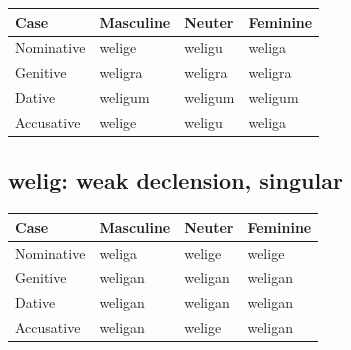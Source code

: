 \par\begingroup
\fontsize{10.5}{13.2}\selectfont
\setlength{\LTleft}{0pt}\setlength{\LTright}{\fill}
\noindent
\begin{tabular}{@{}>{\raggedright\arraybackslash}p{28.89mm}>{\raggedright\arraybackslash}p{28.89mm}>{\raggedright\arraybackslash}p{28.89mm}>{\raggedright\arraybackslash}p{28.89mm}@{}}
\toprule
\textbf{Case} & \textbf{Masculine} & \textbf{Neuter} & \textbf{Feminine} \\
\midrule
Nominative & welige & weligu & weliga \\
Genitive & weligra & weligra & weligra \\
Dative & weligum & weligum & weligum \\
Accusative & welige & weligu & weliga \\
\bottomrule
\end{tabular}
\par\endgroup

\subsection*{welig: weak declension, singular}

\par\begingroup
\fontsize{10.5}{13.2}\selectfont
\setlength{\LTleft}{0pt}\setlength{\LTright}{\fill}
\noindent
\begin{tabular}{@{}>{\raggedright\arraybackslash}p{28.89mm}>{\raggedright\arraybackslash}p{28.89mm}>{\raggedright\arraybackslash}p{28.89mm}>{\raggedright\arraybackslash}p{28.89mm}@{}}
\toprule
\textbf{Case} & \textbf{Masculine} & \textbf{Neuter} & \textbf{Feminine} \\
\midrule
Nominative & weliga & welige & welige \\
Genitive & weligan & weligan & weligan \\
Dative & weligan & weligan & weligan \\
Accusative & weligan & welige & weligan \\
\bottomrule
\end{tabular}
\par\endgroup

